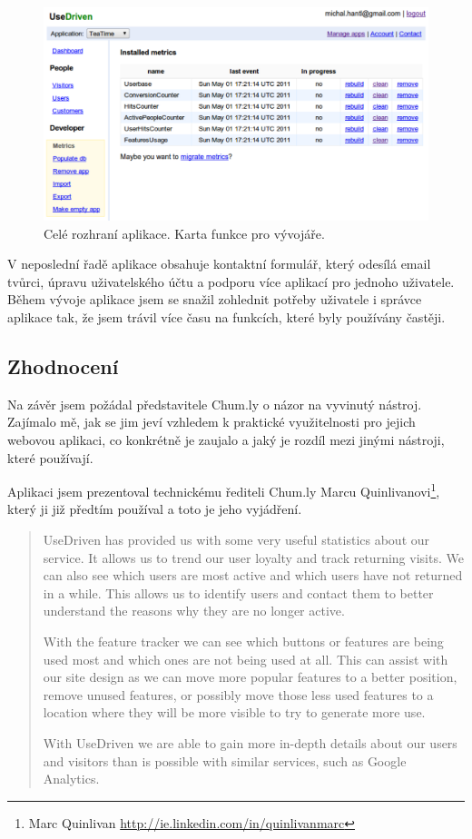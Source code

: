 \documentclass[bc,male,java,dept456]{diploma}						%
\begin{document}
\begin{figure}[h]
	\centering
	\includegraphics[width=14.65cm]{img/developer_functions.pdf}
	\caption{Celé rozhraní aplikace. Karta funkce pro vývojáře.}
	\label{img:developer_features}
\end{figure}

V neposlední řadě aplikace obsahuje kontaktní formulář, který odesílá email tvůrci, úpravu uživatelského účtu a podporu více aplikací pro jednoho uživatele. Během vývoje aplikace jsem se snažil zohlednit potřeby uživatele i správce aplikace tak, že jsem trávil více času na funkcích, které byly používány častěji.








\subsection{Zhodnocení}

Na závěr jsem požádal představitele Chum.ly o názor na vyvinutý nástroj. Zajímalo mě, jak se jim jeví vzhledem k praktické využitelnosti pro jejich webovou aplikaci, co konkrétně je zaujalo a jaký je rozdíl mezi jinými nástroji, které používají.

Aplikaci jsem prezentoval technickému řediteli Chum.ly Marcu Quinlivanovi\footnote{Marc Quinlivan \url{http://ie.linkedin.com/in/quinlivanmarc}}, který ji již předtím používal a toto je jeho vyjádření.

\begin{quote}
UseDriven has provided us with some very useful statistics about our
service. It allows us to trend our user loyalty and track returning visits. We can also see which users are most active and which users have not
returned in a while. This allows us to identify users and contact them to better understand the reasons why they are no longer active.

With the feature tracker we can see which buttons or features are being used most and which ones are not being used at all. This can assist with our site design as we can move more popular features to a better position, remove unused features, or possibly move those less used features to a location where they will be more visible to try to generate more use.

With UseDriven we are able to gain more in-depth details about our users and visitors than is possible with similar services, such as Google
Analytics.
\end{quote}
\end{document}
